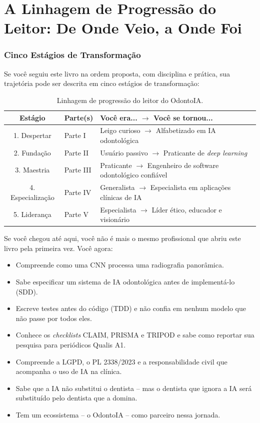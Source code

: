 \section{A Linhagem de Progressão do Leitor: De Onde Veio, a Onde Foi}
\label{sec:linhagem}

\niveldois

\subsubsection{Cinco Estágios de Transformação}

Se você seguiu este livro na ordem proposta, com disciplina e prática, sua
trajetória pode ser descrita em cinco estágios de transformação:

\begin{table}[H]
  \centering
  \caption{Linhagem de progressão do leitor do OdontoIA.}
  \label{tab:linhagem-leitor}
  \begin{tabularx}{\textwidth}{clX}
    \toprule
    \textbf{Estágio} & \textbf{Parte(s)} & \textbf{Você era... $\rightarrow$ Você se tornou...} \\
    \midrule
    1. Despertar & Parte I & Leigo curioso $\rightarrow$ Alfabetizado em IA
      odontológica \\
    2. Fundação & Parte II & Usuário passivo $\rightarrow$ Praticante de
      \textit{deep learning} \\
    3. Maestria & Parte III & Praticante $\rightarrow$ Engenheiro de software
      odontológico confiável \\
    4. Especialização & Parte IV & Generalista $\rightarrow$ Especialista em
      aplicações clínicas de IA \\
    5. Liderança & Parte V & Especialista $\rightarrow$ Líder ético, educador
      e visionário \\
    \bottomrule
  \end{tabularx}
\end{table}

Se você chegou até aqui, você não é mais o mesmo profissional que abriu este
livro pela primeira vez. Você agora:

\begin{itemize}
  \item Compreende como uma CNN processa uma radiografia panorâmica.
  \item Sabe especificar um sistema de IA odontológica antes de implementá-lo
    (SDD).
  \item Escreve testes antes do código (TDD) e não confia em nenhum modelo que
    não passe por todos eles.
  \item Conhece os \textit{checklists} CLAIM, PRISMA e TRIPOD e sabe como
    reportar sua pesquisa para periódicos Qualis A1.
  \item Compreende a LGPD, o PL 2338/2023 e a responsabilidade civil que
    acompanha o uso de IA na clínica.
  \item Sabe que a IA não substitui o dentista -- mas o dentista que ignora a
    IA será substituído pelo dentista que a domina.
  \item Tem um ecossistema -- o OdontoIA -- como parceiro nessa jornada.
\end{itemize}

